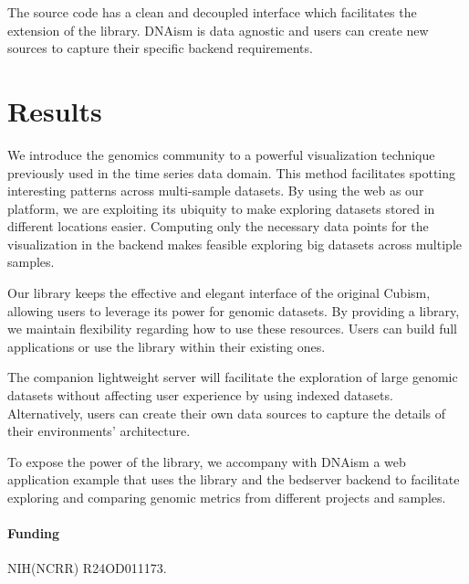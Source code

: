 \documentclass{bioinfo}
\begin{document}
The source code has a clean and decoupled interface which facilitates the
extension of the library. DNAism is data agnostic and users can create new
sources to capture their specific backend requirements.

\section{Results}

We introduce the genomics community to a powerful visualization technique
previously used in the time series data domain. This method facilitates
spotting interesting patterns across multi-sample datasets. By using the web
as our platform, we are exploiting its ubiquity to make exploring datasets
stored in different locations easier.  Computing only the necessary data points
for the visualization in the backend makes feasible exploring big datasets
across multiple samples.

Our library keeps the effective and elegant interface of the original Cubism,
allowing users to leverage its power for genomic datasets. By providing a
library, we maintain flexibility regarding how to use these resources. Users
can build full applications or use the library within their existing ones.

The companion lightweight server will facilitate the exploration of large
genomic datasets without affecting user experience by using indexed datasets.
Alternatively, users can create their own data sources to capture the details
of their environments' architecture.

To expose the power of the library, we accompany with DNAism a web application
example that uses the library and the bedserver backend to facilitate exploring
and comparing genomic metrics from different projects and samples.




\paragraph{Funding\textcolon} NIH(NCRR) R24OD011173.


\end{document}
